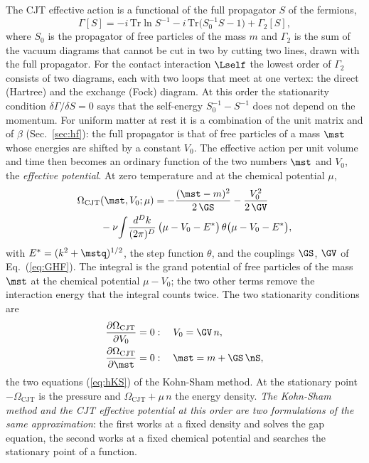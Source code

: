 The CJT effective action is a functional of the full propagator $S$ of the fermions,
\begin{equation}
\Gamma[S]=-i\,\mathrm{Tr}\ln S^{-1}-i\,\mathrm{Tr}\big(S_0^{-1}S-1\big)+\Gamma_2[S],
\label{eq:GammaCJT}
\end{equation}
where $S_0$ is the propagator of free particles of the mass $m$ and $\Gamma_2$ is the sum of the
vacuum diagrams that cannot be cut in two by cutting two lines, drawn with the full propagator. For
the contact interaction $\Lself$ the lowest order of $\Gamma_2$ consists of two diagrams, each with
two loops that meet at one vertex: the direct (Hartree) and the exchange (Fock) diagram. At this
order the stationarity condition $\delta\Gamma/\delta S=0$ says that the self-energy
$S_0^{-1}-S^{-1}$ does not depend on the momentum. For uniform matter at rest it is a combination of
the unit matrix and of $\beta$ (Sec.~\ref{sec:hf}): the full propagator is that of free particles of
a mass $\mst$ whose energies are shifted by a constant $V_0$. The effective action per unit volume
and time then becomes an ordinary function of the two numbers $\mst$ and $V_0$, the \emph{effective
potential}. At zero temperature and at the chemical potential $\mu$,
\begin{align}
\Omega_{\mathrm{CJT}}&(\mst,V_0;\mu)=-\frac{(\mst-m)^{2}}{2\,\GS}-\frac{V_0^{2}}{2\,\GV}\nonumber\\
&-\nu\!\int\!\frac{d^{D}k}{(2\pi)^{D}}\,\big(\mu-V_0-E^{*}\big)\,\theta\big(\mu-V_0-E^{*}\big),
\label{eq:OmegaCJT}
\end{align}
with $E^{*}=(k^{2}+\mstq)^{1/2}$, the step function $\theta$, and the couplings $\GS$, $\GV$ of
Eq.~(\ref{eq:GHF}). The integral is the grand potential of free particles of the mass $\mst$ at
the chemical potential $\mu-V_0$; the two other terms remove the interaction energy that the
integral counts twice. The two stationarity conditions are
\begin{equation}
\begin{aligned}
\frac{\partial\Omega_{\mathrm{CJT}}}{\partial V_0}&=0:\quad V_0=\GV\,n,\\
\frac{\partial\Omega_{\mathrm{CJT}}}{\partial\mst}&=0:\quad\mst=m+\GS\,\nS ,
\end{aligned}
\label{eq:CJTstat}
\end{equation}
the two equations (\ref{eq:hKS}) of the Kohn-Sham method. At the stationary point
$-\Omega_{\mathrm{CJT}}$ is the pressure and $\Omega_{\mathrm{CJT}}+\mu\,n$ the energy density.
\emph{The Kohn-Sham method and the CJT effective potential at this order are two formulations of the
same approximation}: the first works at a fixed density and solves the gap equation, the second
works at a fixed chemical potential and searches the stationary point of a function.

